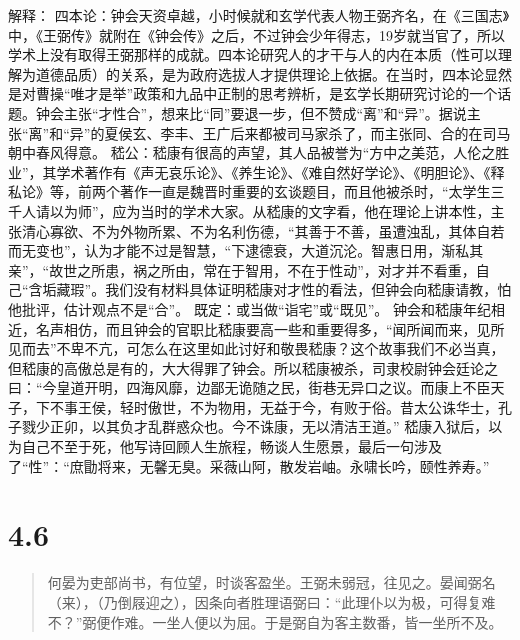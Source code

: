 \documentclass[]{book}
\begin{document}
解释：
四本论：钟会天资卓越，小时候就和玄学代表人物王弼齐名，在《三国志》中，《王弼传》就附在《钟会传》之后，不过钟会少年得志，19岁就当官了，所以学术上没有取得王弼那样的成就。四本论研究人的才干与人的内在本质（性可以理解为道德品质）的关系，是为政府选拔人才提供理论上依据。在当时，四本论显然是对曹操``唯才是举''政策和九品中正制的思考辨析，是玄学长期研究讨论的一个话题。钟会主张``才性合''，想来比``同''要退一步，但不赞成``离''和``异''。据说主张``离''和``异''的夏侯玄、李丰、王广后来都被司马家杀了，而主张同、合的在司马朝中春风得意。
嵇公：嵇康有很高的声望，其人品被誉为``方中之美范，人伦之胜业''，其学术著作有《声无哀乐论》、《养生论》、《难自然好学论》、《明胆论》、《释私论》等，前两个著作一直是魏晋时重要的玄谈题目，而且他被杀时，``太学生三千人请以为师''，应为当时的学术大家。从嵇康的文字看，他在理论上讲本性，主张清心寡欲、不为外物所累、不为名利伤德，``其善于不善，虽遭浊乱，其体自若而无变也''，认为才能不过是智慧，``下逮德衰，大道沉沦。智惠日用，渐私其亲''，``故世之所患，祸之所由，常在于智用，不在于性动''，对才并不看重，自己``含垢藏瑕''。我们没有材料具体证明嵇康对才性的看法，但钟会向嵇康请教，怕他批评，估计观点不是``合''。
既定：或当做``诣宅''或``既见''。
钟会和嵇康年纪相近，名声相仿，而且钟会的官职比嵇康要高一些和重要得多，``闻所闻而来，见所见而去''不卑不亢，可怎么在这里如此讨好和敬畏嵇康？这个故事我们不必当真，但嵇康的高傲总是有的，大大得罪了钟会。所以嵇康被杀，司隶校尉钟会廷论之曰：``今皇道开明，四海风靡，边鄙无诡随之民，街巷无异口之议。而康上不臣天子，下不事王侯，轻时傲世，不为物用，无益于今，有败于俗。昔太公诛华士，孔子戮少正卯，以其负才乱群惑众也。今不诛康，无以清洁王道。''
嵇康入狱后，以为自己不至于死，他写诗回顾人生旅程，畅谈人生愿景，最后一句涉及了``性''：``庶勖将来，无馨无臭。采薇山阿，散发岩岫。永啸长吟，颐性养寿。''

\section{4.6}\label{section-186}

\begin{quote}
何晏为吏部尚书，有位望，时谈客盈坐。王弼未弱冠，往见之。晏闻弼名（来），（乃倒屐迎之），因条向者胜理语弼曰：``此理仆以为极，可得复难不？''弼便作难。一坐人便以为屈。于是弼自为客主数番，皆一坐所不及。
\end{quote}
\end{document}
